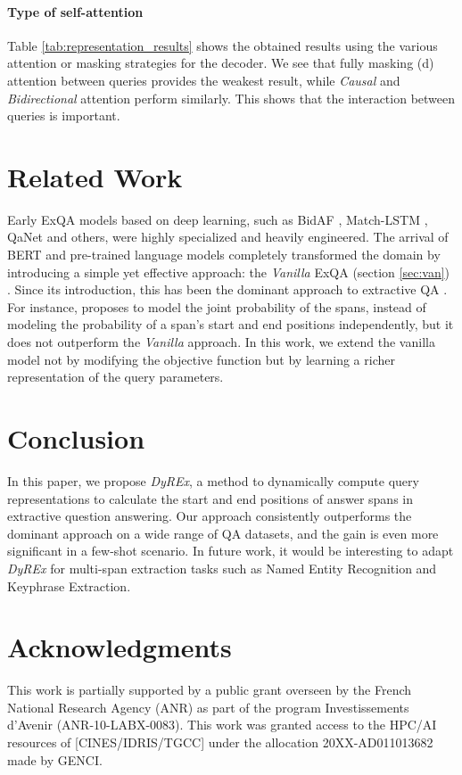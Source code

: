 \documentclass{article}
\begin{document}
\paragraph{Type of self-attention} Table \ref{tab:representation_results} shows the obtained results using the various attention or masking strategies for the decoder. We see that fully masking (d) attention between queries provides the weakest result, while \textit{Causal} and \textit{Bidirectional} attention perform similarly. This shows that the interaction between queries is important.

\section{Related Work}
\label{sec:related_work}

Early ExQA models based on deep learning, such as BidAF \citep{bidaf}, Match-LSTM \citep{Match-LSTM}, QaNet \citep{QaNet} and others, were highly specialized and heavily engineered. The arrival of BERT and pre-trained language models completely transformed the domain by introducing a simple yet effective approach: the \textit{Vanilla} ExQA (section \ref{sec:van}) \citep{BERT}. Since its introduction, this has been the dominant approach to extractive QA \citep{RoBERTa, span_BERT}. For instance, \citep{Fajcik2021RethinkingTO} proposes to model the joint probability of the spans, instead of modeling the probability of a span’s start and end positions independently, but it does not outperform the \textit{Vanilla} approach. In this work, we extend the vanilla model not by modifying the objective function but by learning a richer representation of the query parameters.

\section{Conclusion}
In this paper, we propose \textit{DyREx}, a method to dynamically compute query representations to calculate the start and end positions of answer spans in extractive question answering. Our approach consistently outperforms the dominant approach on a wide range of QA datasets, and the gain is even more significant in a few-shot scenario. In future work, it would be interesting to adapt \textit{DyREx} for multi-span extraction tasks such as Named Entity Recognition and Keyphrase Extraction.

\section*{Acknowledgments}
 This work is partially supported by a public grant overseen by the French National Research Agency (ANR) as part of the program Investissements d’Avenir (ANR-10-LABX-0083). This work was granted access to the HPC/AI resources of [CINES/IDRIS/TGCC] under the allocation 20XX-AD011013682 made by GENCI.




\appendix
\end{document}
